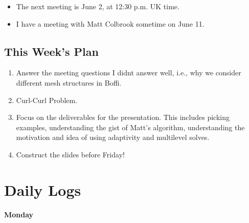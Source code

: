 \documentclass[12pt,a4paper]{article}
\begin{document}
\begin{itemize}
\begin{enumerate}
        \item Examiners will focus on asking motivation questions about the project structure in this setting. The hard hitting background questions will be in the viva. 

        \item Have a draft to Patrick by Friday. 
    \end{enumerate}


    \item The next meeting is June 2, at 12:30 p.m. UK time.

    \item I have a meeting with Matt Colbrook sometime on June 11.
    
\end{itemize}


\subsection{This Week's Plan}

\begin{enumerate}
    \item Answer the meeting questions I didnt answer well, i.e., why we consider different mesh structures in Boffi. 
    \item Curl-Curl Problem.
    \item Focus on the deliverables for the presentation. This includes picking examples, understanding the gist of Matt's algorithm, understanding the motivation and idea of using adaptivity and multilevel solves.
    \item Construct the slides before Friday!
\end{enumerate}


\section{Daily Logs}

\textbf{Monday} 
\end{document}
